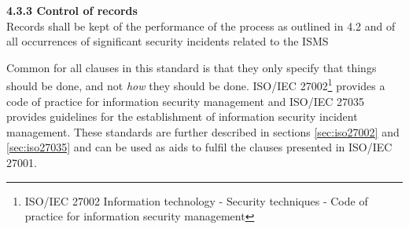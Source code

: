 \textbf{4.3.3 Control of records}\\
Records shall be kept of the performance of the process as outlined in 4.2 and of all occurrences of significant security incidents related to the \ac{ISMS}

Common for all clauses in this standard is that they only specify that things should be done, and not \textit{how} they should be done. \acs{ISO}/\acs{IEC} 27002\footnote{ \acs{ISO}/\acs{IEC} 27002 Information technology - Security techniques
- Code of practice for information security management} provides a code of practice for information security management and \acs{ISO}/\acs{IEC} 27035 provides guidelines for the establishment of information security incident management. These standards are further described in sections \ref{sec:iso27002} and \ref{sec:iso27035} and can be used as aids to fulfil the clauses presented in \acs{ISO}/\acs{IEC} 27001.